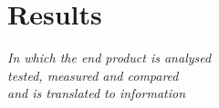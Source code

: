 \chapter{Results}

\begin{flushright}{\slshape
    In which the end product is analysed\\
    tested, measured and compared\\
    and is translated to information
}
\end{flushright}

